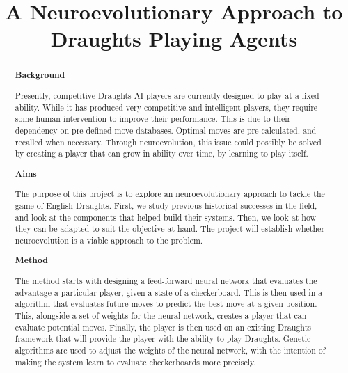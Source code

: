 \documentclass[12pt,a4paper]{article}
\title{A Neuroevolutionary Approach to Draughts Playing Agents}
\author{}
\date{}
\begin{document}
\maketitle


\begin{abstract}


    {\bf Background}

    Presently, competitive Draughts AI players are currently designed to play at a fixed ability. While it has produced very competitive and intelligent players, they require some human intervention to improve their performance. 
    This is due to their dependency on pre-defined move databases. Optimal moves are pre-calculated, and recalled when necessary. Through neuroevolution, this issue could possibly be solved by creating a player that can grow in ability over time, by learning to play itself.
    
    {\bf Aims}

    The purpose of this project is to explore an neuroevolutionary approach to tackle the game of English Draughts. First, we study previous historical successes in the field, and look at the components that helped build their systems. Then, we look at how they can be adapted to suit the objective at hand. The project will establish whether neuroevolution is a viable approach to the problem.
    
    {\bf Method}


    The method starts with designing a feed-forward neural network that evaluates the advantage a particular player, given a state of a checkerboard. This is then used in a algorithm that evaluates future moves to predict the best move at a given position. This, alongside a set of weights for the neural network, creates a player that can evaluate potential moves. Finally, the player is then used on an existing Draughts framework that will provide the player with the ability to play Draughts. Genetic algorithms are used to adjust the weights of the neural network, with the intention of making the system learn to evaluate checkerboards more precisely.


\end{abstract}
\end{document}
